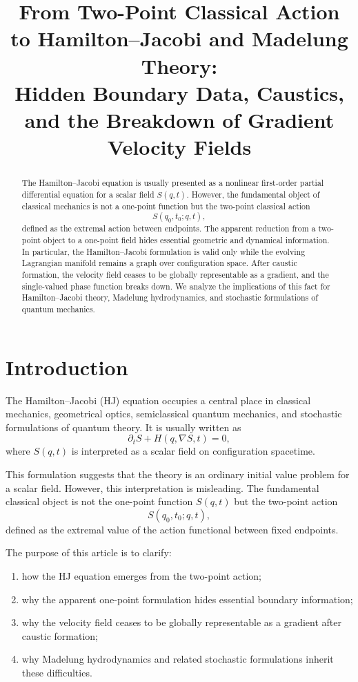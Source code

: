 \documentclass[11pt]{article}
\title{From Two-Point Classical Action to Hamilton--Jacobi and Madelung Theory:\\
Hidden Boundary Data, Caustics, and the Breakdown of Gradient Velocity Fields}
\author{}
\date{}
\begin{document}
\maketitle

\begin{abstract}
The Hamilton--Jacobi equation is usually presented as a nonlinear first-order partial differential equation for a scalar field $S(q,t)$. However, the fundamental object of classical mechanics is not a one-point function but the two-point classical action
\[
S(q_0,t_0;q,t),
\]
defined as the extremal action between endpoints. The apparent reduction from a two-point object to a one-point field hides essential geometric and dynamical information. In particular, the Hamilton--Jacobi formulation is valid only while the evolving Lagrangian manifold remains a graph over configuration space. After caustic formation, the velocity field ceases to be globally representable as a gradient, and the single-valued phase function breaks down. We analyze the implications of this fact for Hamilton--Jacobi theory, Madelung hydrodynamics, and stochastic formulations of quantum mechanics.
\end{abstract}

\tableofcontents

\section{Introduction}

The Hamilton--Jacobi (HJ) equation occupies a central place in classical mechanics, geometrical optics, semiclassical quantum mechanics, and stochastic formulations of quantum theory. It is usually written as
\begin{equation}
\partial_t S + H(q,\nabla S,t)=0,
\label{HJ}
\end{equation}
where $S(q,t)$ is interpreted as a scalar field on configuration spacetime.

This formulation suggests that the theory is an ordinary initial value problem for a scalar field. However, this interpretation is misleading. The fundamental classical object is not the one-point function $S(q,t)$ but the two-point action
\begin{equation}
S(q_0,t_0;q,t),
\end{equation}
defined as the extremal value of the action functional between fixed endpoints.

The purpose of this article is to clarify:
\begin{enumerate}[label=(\roman*)]
\item how the HJ equation emerges from the two-point action;
\item why the apparent one-point formulation hides essential boundary information;
\item why the velocity field ceases to be globally representable as a gradient after caustic formation;
\item why Madelung hydrodynamics and related stochastic formulations inherit these difficulties.
\end{enumerate}
\end{document}
